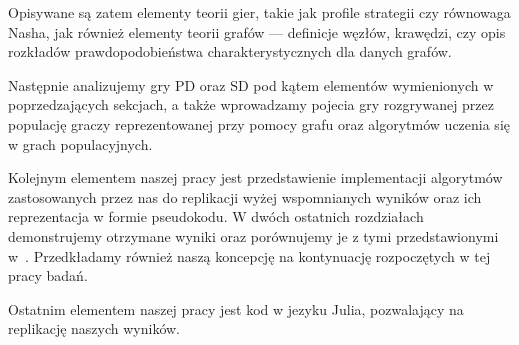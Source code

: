 \documentclass[english, twoside, 12pt, a4paper]{article}
\theoremstyle{definition}
\theoremstyle{plain}
\theoremstyle{remark}
\begin{document}
Opisywane są zatem elementy teorii gier, takie jak profile strategii czy równowaga Nasha, jak również elementy teorii grafów --- definicje węzłów, krawędzi, czy opis rozkładów prawdopodobieństwa charakterystycznych dla danych grafów.

Następnie analizujemy gry PD oraz SD pod kątem elementów wymienionych w poprzedzających sekcjach, a także wprowadzamy pojecia gry rozgrywanej przez populację graczy reprezentowanej przy pomocy grafu oraz algorytmów uczenia się w grach populacyjnych. 

Kolejnym elementem naszej pracy jest przedstawienie implementacji algorytmów zastosowanych przez nas do replikacji wyżej wspomnianych wyników oraz ich reprezentacja w formie pseudokodu. W dwóch ostatnich rozdziałach demonstrujemy otrzymane wyniki oraz porównujemy je z tymi przedstawionymi w~\cite{santos2005scale}. Przedkładamy również naszą koncepcję na kontynuację rozpoczętych w tej pracy badań. 

Ostatnim elementem naszej pracy jest kod w jezyku Julia, pozwalający na replikację naszych wyników.
\end{document}
